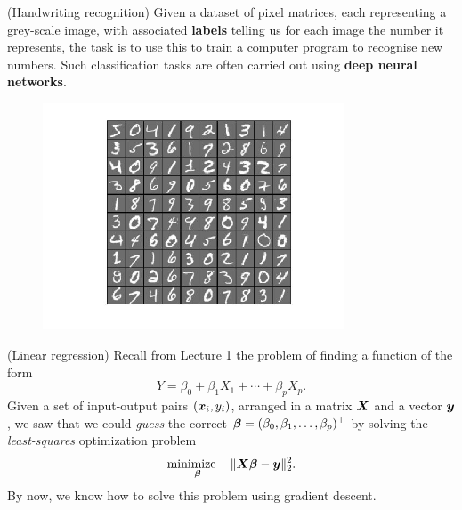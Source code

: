 \begin{example}(Handwriting recognition)
Given a dataset of pixel matrices, each representing a grey-scale image, with associated \textbf{labels} telling us for each image the number it represents, the task is to use this to train a computer program to recognise new numbers. Such classification tasks are often carried out using \textbf{deep neural networks}. 

\begin{figure}[h!]
\centering
\includegraphics[width=0.8\textwidth]{images/letters.jpg}
\end{figure}

\end{example}

\begin{example}(Linear regression)
Recall from Lecture 1 the problem of finding a function of the form
\begin{equation*}
  Y = \beta_0+\beta_1X_1+\cdots +\beta_pX_p.
\end{equation*}
Given a set of input-output pairs $(\bm{x}_i,y_i)$, arranged in a matrix $\bm{X}$ and a vector $\bm{y}$, we saw that we could {\em guess} the correct $\bm{\beta} = (\beta_0,\beta_1,\dots, \beta_p)^{\top}$ by solving the {\em least-squares} optimization problem
\begin{equation*}
  \mathop{\text{minimize}\quad}_{\bm{\beta}} \Vert {\bm{X}\bm{\beta}-\bm{y}}\Vert_2^2.
\end{equation*}
By now, we know how to solve this problem using gradient descent.
\end{example}

